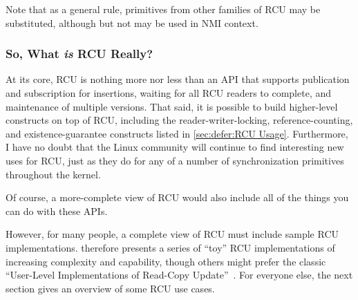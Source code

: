 Note that as a general rule, primitives from other families of RCU
may be substituted, although  but not
 may be used in NMI context.

\subsubsection{So, What \emph{is} RCU Really?}
\label{sec:defer:So; What is RCU Really?}

At its core, RCU is nothing more nor less than an API that supports
publication and subscription for insertions, waiting for all RCU readers
to complete, and maintenance of multiple versions.
That said, it is possible to build higher-level constructs
on top of RCU, including the reader-writer-locking, reference-counting,
and existence-guarantee constructs listed in
\cref{sec:defer:RCU Usage}.
Furthermore, I have no doubt that the Linux community will continue to
find interesting new uses for RCU,
just as they do for any of a number of synchronization
primitives throughout the kernel.

Of course, a more-complete view of RCU would also include
all of the things you can do with these APIs.

However, for many people, a complete view of RCU must include sample
RCU implementations.
 therefore presents a series
of ``toy'' RCU implementations of increasing complexity and capability,
though others might prefer the classic
``User-Level Implementations of Read-Copy
Update''~\cite{MathieuDesnoyers2012URCU}.
For everyone else, the next section gives an overview of some RCU use cases.
